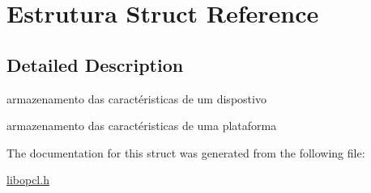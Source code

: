 \hypertarget{struct_estrutura}{}\section{Estrutura Struct Reference}
\label{struct_estrutura}


\subsection{Detailed Description}
armazenamento das caractéristicas de um dispostivo

armazenamento das caractéristicas de uma plataforma 

The documentation for this struct was generated from the following file\+:\begin{DoxyCompactItemize}
\item 
\hyperlink{libopcl_8h}{libopcl.\+h}\end{DoxyCompactItemize}
